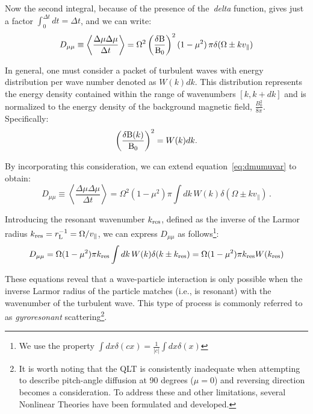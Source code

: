 Now the second integral, because of the presence of the~\emph{delta} function, gives just a factor $\int_{0}^{\Delta t} dt = \Delta t$, and we can write:
%
\begin{equation}
D_{\mu\mu} \equiv \left\langle \frac{\Delta \mu \Delta \mu}{\Delta t} \right\rangle = \Omega^2 \left( \frac{\delta {\rm B}}{{\rm B}_0} \right)^2 (1 - \mu^2) \, \pi \delta(\Omega \pm k v_{\parallel})
\label{eq:dmumuvar}
\end{equation}

In general, one must consider a packet of turbulent waves with energy distribution per wave number denoted as $W(k) dk$. This distribution represents the energy density contained within the range of wavenumbers $[k, k + dk]$ and is normalized to the energy density of the background magnetic field, $\frac{B_0^2}{8\pi}$. Specifically:
%
\begin{equation}
\left( \frac{\delta {\rm B}(k)}{{\rm B}_0} \right)^2 = W(k) dk.
\end{equation}

By incorporating this consideration, we can extend equation~\eqref{eq:dmumuvar} to obtain:
%
\begin{equation}
D_{\mu \mu} \equiv \left\langle \frac{\Delta \mu \Delta \mu}{\Delta t} \right\rangle = \Omega^2 (1 - \mu^2) \pi \int dk \, W(k) \delta(\Omega \pm k v_{\parallel}) \, .
\end{equation}

Introducing the resonant wavenumber $k_{\rm res}$, defined as the inverse of the Larmor radius $k_{\rm res} = r_{\rm L}^{-1} = \Omega/ v_\|$, we can express $D_{\mu \mu}$ as follows\footnote{We use the property $\int dx \delta (c x) = \frac{1}{|c|} \int dx \delta (x)$}:
%
\begin{equation} 
D_{\mu \mu} = \Omega (1 - \mu^2) \pi k_{\mathrm{res}} \int dk \, W(k) \delta(k \pm k_{\mathrm{res}}) = \Omega (1 - \mu^2) \pi k_{\mathrm{res}} W(k_{\rm res})
\end{equation}

These equations reveal that a wave-particle interaction is only possible when the inverse Larmor radius of the particle matches (i.e., is resonant) with the wavenumber of the turbulent wave. This type of process is commonly referred to as \emph{gyroresonant} scattering\footnote{It is worth noting that the QLT is consistently inadequate when attempting to describe pitch-angle diffusion at 90 degrees ($\mu = 0$) and reversing direction becomes a consideration. To address these and other limitations, several Nonlinear Theories have been formulated and developed.}.

